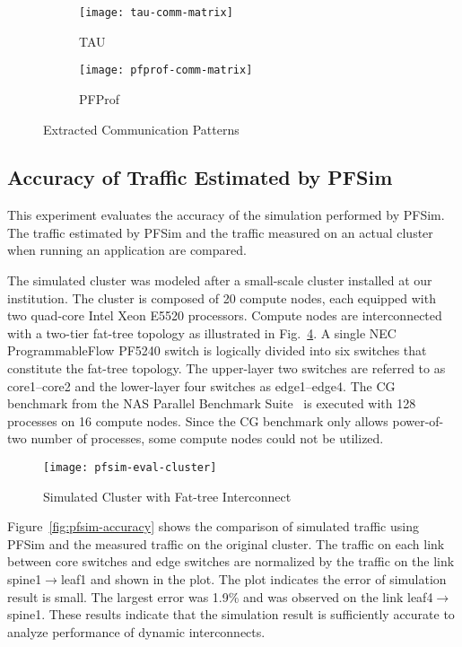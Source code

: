 \begin{figure}
    \centering
    \begin{subfigure}{.49\linewidth}
        \centering
        \texttt{[image: tau-comm-matrix]}
        \caption{TAU}%
        \label{fig:tau-comm-matrix}
    \end{subfigure}
    \begin{subfigure}{.49\linewidth}
        \centering
        \texttt{[image: pfprof-comm-matrix]}
        \caption{PFProf}%
        \label{fig:pfprof-comm-matrix}
    \end{subfigure}
    \caption{Extracted Communication Patterns}%
    \label{fig:profiler-comparison}
\end{figure}

\subsection{Accuracy of Traffic Estimated by PFSim}%
\label{sec:ii-eval-pfsim}

This experiment evaluates the accuracy of the simulation performed by PFSim.
The traffic estimated by PFSim and the traffic measured on an actual cluster
when running an application are compared.

The simulated cluster was modeled after a small-scale cluster installed at our
institution. The cluster is composed of 20 compute nodes, each equipped with
two quad-core Intel Xeon E5520 processors. Compute nodes are interconnected
with a two-tier fat-tree topology as illustrated in
Fig.~\ref{fig:cluster-config}. A single NEC ProgrammableFlow PF5240 switch is
logically divided into six switches that constitute the fat-tree topology.
The upper-layer two switches are referred to as core1--core2 and the
lower-layer four switches as edge1--edge4. The CG benchmark from the
NAS Parallel Benchmark Suite~\autocite{Bailey1991} is executed with 128
processes on 16 compute nodes. Since the CG benchmark only allows power-of-two
number of processes, some compute nodes could not be utilized.

\begin{figure}
    \centering
    \texttt{[image: pfsim-eval-cluster]}
    \caption{Simulated Cluster with Fat-tree Interconnect}%
    \label{fig:cluster-config}
\end{figure}

Figure~\ref{fig:pfsim-accuracy} shows the comparison of simulated traffic
using PFSim and the measured traffic on the original cluster. The traffic on
each link between core switches and edge switches are normalized by the
traffic on the link spine1$\rightarrow$leaf1 and shown in the plot. The plot
indicates the error of simulation result is small. The largest error was 1.9\%
and was observed on the link leaf4$\rightarrow$spine1. These results indicate
that the simulation result is sufficiently accurate to analyze performance of
dynamic interconnects.

